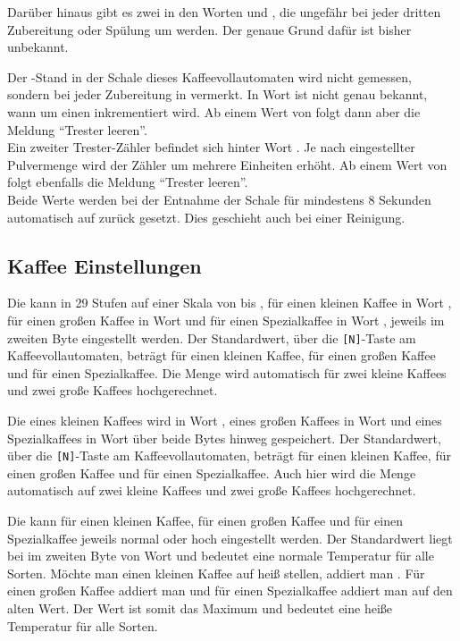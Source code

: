 Darüber hinaus gibt es zwei  in den Worten  und , die ungefähr bei jeder dritten Zubereitung oder Spülung um  werden.
Der genaue Grund dafür ist bisher unbekannt.

Der -Stand in der Schale dieses Kaffeevollautomaten wird nicht gemessen, sondern bei jeder Zubereitung in  vermerkt.
In Wort  ist nicht genau bekannt, wann um einen inkrementiert wird.
Ab einem Wert von  folgt dann aber die Meldung "`Trester leeren"'.\\
Ein zweiter Trester-Zähler befindet sich hinter Wort .
Je nach eingestellter Pulvermenge wird der Zähler um mehrere Einheiten erhöht.
Ab einem Wert von  folgt ebenfalls die Meldung "`Trester leeren"'.\\
Beide Werte werden bei der Entnahme der Schale für mindestens 8 Sekunden automatisch auf  zurück gesetzt.
Dies geschieht auch bei einer Reinigung.

\subsection{Kaffee Einstellungen}
Die  kann in 29 Stufen auf einer Skala von  bis , für einen kleinen Kaffee in Wort , für einen großen Kaffee in Wort  und für einen Spezialkaffee in Wort , jeweils im zweiten Byte eingestellt werden.
Der Standardwert, über die \texttt{[N]}-Taste am Kaffeevollautomaten, beträgt  für einen kleinen Kaffee,  für einen großen Kaffee und  für einen Spezialkaffee.
Die Menge wird automatisch für zwei kleine Kaffees und zwei große Kaffees hochgerechnet.

Die  eines kleinen Kaffees wird in Wort , eines großen Kaffees in Wort  und eines Spezialkaffees in Wort  über beide Bytes hinweg gespeichert.
Der Standardwert, über die \texttt{[N]}-Taste am Kaffeevollautomaten, beträgt  für einen kleinen Kaffee,  für einen großen Kaffee und  für einen Spezialkaffee.
Auch hier wird die Menge automatisch auf zwei kleine Kaffees und zwei große Kaffees hochgerechnet.

Die  kann für einen kleinen Kaffee, für einen großen Kaffee und für einen Spezialkaffee jeweils normal oder hoch eingestellt werden.
Der Standardwert liegt bei  im zweiten Byte von Wort  und bedeutet eine normale Temperatur für alle Sorten.
Möchte man einen kleinen Kaffee auf heiß stellen, addiert man .
Für einen großen Kaffee addiert man  und für einen Spezialkaffee addiert man  auf den alten Wert.
Der Wert  ist somit das Maximum und bedeutet eine heiße Temperatur für alle Sorten.

